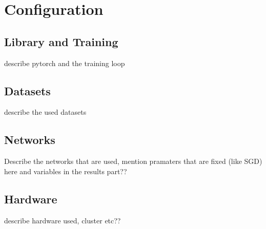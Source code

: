 \section{Configuration}

\subsection{Library and Training}
describe pytorch and the training loop

\subsection{Datasets}
describe the used datasets
\subsection{Networks}
Describe the networks that are used,
mention pramaters that are fixed (like SGD) here and variables in the results part??
\subsection{Hardware}
describe hardware used, cluster etc??
